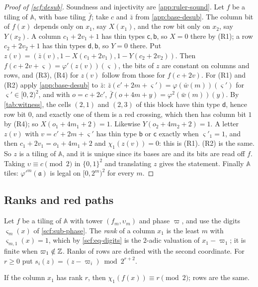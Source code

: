 \begin{proof}[Proof of \cref{scf:desub}]
Soundness and injectivity are \cref{app:ruler-sound}. Let $f$ be a tiling of $\mathbb A$, with base tiling $\bar f$; take $c$ and $\bar z$ from \cref{app:base-desub}. The column bit of $f(x)$ depends only on $x_1$, say $X(x_1)$, and the row bit only on $x_2$, say $Y(x_2)$. A column $c_1+2v_1+1$ has thin types $\mathsf c,\mathsf b$, so $X=0$ there by (R1); a row $c_2+2v_2+1$ has thin types $\mathsf d,\mathsf b$, so $Y=0$ there. Put $z(v)=(\bar z(v),1-X(c_1+2v_1),1-Y(c_2+2v_2))$. Then $f(c+2v+\varsigma)=\varphi'(z(v))(\varsigma)$, the bits of $z$ are constant on columns and rows, and (R3), (R4) for $z(v)$ follow from those for $f(c+2v)$. For (R1) and (R2) apply \cref{app:base-desub} to $\bar z$: $\bar z(c'+2m+\varsigma')=\varphi(\bar w(m))(\varsigma')$ for $\varsigma'\in[0,2)^2$, and with $o=c+2c'$, $\bar f(o+4m+y)=\varphi^2(\bar w(m))(y)$. By \cref{tab:witness}, the cells $(2,1)$ and $(2,3)$ of this block have thin type $\mathsf d$, hence row bit $0$, and exactly one of them is a red crossing, which then has column bit $1$ by (R4); so $X(o_1+4m_1+2)=1$. Likewise $Y(o_2+4m_2+2)=1$. A letter $z(v)$ with $v=c'+2m+\varsigma'$ has thin type $\mathsf b$ or $\mathsf c$ exactly when $\varsigma'_1=1$, and then $c_1+2v_1=o_1+4m_1+2$ and $\chi_1(z(v))=0$: this is (R1). (R2) is the same. So $z$ is a tiling of $\mathbb A$, and it is unique since its bases are and its bits are read off $f$. Taking $\upsilon\equiv c\pmod2$ in $\{0,1\}^2$ and translating $z$ gives the statement. Finally $\mathbb A$ tiles: $\varphi'^m(\mathfrak a)$ is legal on $[0,2^m)^2$ for every $m$.
\end{proof}

\subsection{Ranks and red paths}

Let $f$ be a tiling of $\mathbb A$ with tower $(f_m,\upsilon_m)$ and phase $\varpi$, and use the digits $\varsigma_m(x)$ of \cref{scf:sub-phase}. The \emph{rank} of a column $x_1$ is the least $m$ with $\varsigma_{m,1}(x)=1$, which by \eqref{scf:eq-digits} is the $2$-adic valuation of $x_1-\varpi_1$; it is finite when $\varpi_1\notin\mathbb{Z}$. Ranks of rows are defined with the second coordinate. For $r\ge0$ put $s_i(z)=(z-\varpi_i)\bmod 2^{r+2}$.

\begin{lemma}\label{app:rank-bits}
If the column $x_1$ has rank $r$, then $\chi_1(f(x))\equiv r\pmod2$; rows are the same.
\end{lemma}

